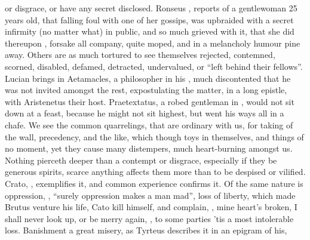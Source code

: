 or disgrace, or have any secret disclosed. Ronseus , reports of a gentlewoman 25 years old, that falling foul with one
of her gossips, was upbraided with a secret infirmity (no matter what) in
public, and so much grieved with it, that she did thereupon , forsake all company, quite moped, and in a melancholy humour
pine away. Others are as much tortured to see themselves rejected, contemned,
scorned, disabled, defamed, detracted, undervalued, or
\enquote{left behind their fellows}. Lucian brings in Aetamacles,
a philosopher in his , much discontented
that he was not invited amongst the rest, expostulating the matter, in a long
epistle, with Aristenetus their host. Praetextatus, a robed gentleman in
\Plutarch{}, would not sit down at a feast, because he might not sit highest, but
went his ways all in a chafe. We see the common quarrelings, that are ordinary
with us, for taking of the wall, precedency, and the like, which though toys in
themselves, and things of no moment, yet they cause many distempers, much
heart-burning amongst us. Nothing pierceth deeper than a contempt or disgrace,
especially if they be generous spirits, scarce anything
affects them more than to be despised or vilified. Crato,
, exemplifies it, and common experience
confirms it. Of the same nature is oppression, , \enquote{surely
oppression makes a man mad}, loss of liberty, which made Brutus venture his
life, Cato kill himself, and \Tully{} complain, , mine heart's broken, I shall never look up, or
be merry again, , to some
parties 'tis a most intolerable loss. Banishment a great misery, as Tyrteus
describes it in an epigram of his,


